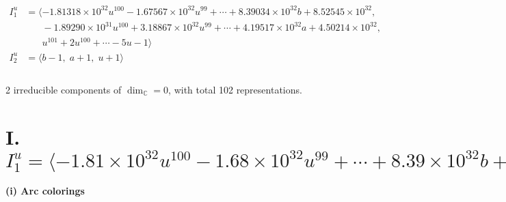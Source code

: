 \documentclass[1p]{elsarticle_modified}
\theoremstyle{definition}
\begin{document}
\begin{align*}
I^u_{1}&=\langle 
-1.81318\times10^{32} u^{100}-1.67567\times10^{32} u^{99}+\cdots+8.39034\times10^{32} b+8.52545\times10^{32},\\
\phantom{I^u_{1}}&\phantom{= \langle  }-1.89290\times10^{31} u^{100}+3.18867\times10^{32} u^{99}+\cdots+4.19517\times10^{32} a+4.50214\times10^{32},\\
\phantom{I^u_{1}}&\phantom{= \langle  }u^{101}+2 u^{100}+\cdots-5 u-1\rangle \\
I^u_{2}&=\langle 
b-1,\;a+1,\;u+1\rangle \\
\\
\end{align*}
\raggedright * 2 irreducible components of $\dim_{\mathbb{C}}=0$, with total 102 representations.\\
\newpage
\renewcommand{\arraystretch}{1}
\centering \section*{I. $I^u_{1}= \langle -1.81\times10^{32} u^{100}-1.68\times10^{32} u^{99}+\cdots+8.39\times10^{32} b+8.53\times10^{32},\;-1.89\times10^{31} u^{100}+3.19\times10^{32} u^{99}+\cdots+4.20\times10^{32} a+4.50\times10^{32},\;u^{101}+2 u^{100}+\cdots-5 u-1 \rangle$}
\flushleft \textbf{(i) Arc colorings}\\
\end{document}
